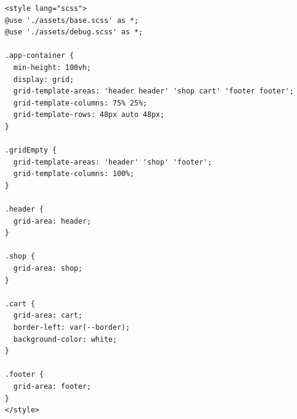 \documentclass{article}
\begin{document}
\begin{verbatim}
<style lang="scss">
@use './assets/base.scss' as *;
@use './assets/debug.scss' as *;

.app-container {
  min-height: 100vh;
  display: grid;
  grid-template-areas: 'header header' 'shop cart' 'footer footer';
  grid-template-columns: 75% 25%;
  grid-template-rows: 48px auto 48px;
}

.gridEmpty {
  grid-template-areas: 'header' 'shop' 'footer';
  grid-template-columns: 100%;
}

.header {
  grid-area: header;
}

.shop {
  grid-area: shop;
}

.cart {
  grid-area: cart;
  border-left: var(--border);
  background-color: white;
}

.footer {
  grid-area: footer;
}
</style>
\end{verbatim}
\end{document}
